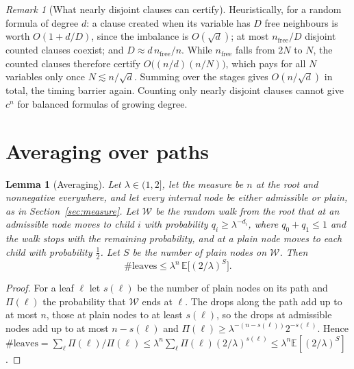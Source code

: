 \documentclass[11pt,a4paper]{article}
\newtheorem{lemma}[theorem]{Lemma}
\theoremstyle{remark}
\newtheorem{remark}[theorem]{Remark}
\newcommand{\E}{\mathbb{E}}
\newcommand{\W}{\mathcal{W}}
\newcommand{\nfree}{n_{\mathrm{free}}}
\begin{document}
\begin{remark}[What nearly disjoint clauses can certify]\label{rem:disjointcap}
Heuristically, for a random formula of degree $d$: a clause created when its
variable has $D$ free neighbours is worth $O(1+d/D)$, since the imbalance is
$O(\sqrt d)$; at most $\nfree/D$ disjoint counted clauses coexist; and
$D\approx d\,\nfree/n$. While $\nfree$ falls from $2N$ to $N$, the counted
clauses therefore certify $O\bigl((n/d)(n/N)\bigr)$, which pays for all $N$
variables only once $N\lesssim n/\sqrt d$. Summing over the stages gives
$O(n/\sqrt d)$ in total, the timing barrier again. Counting only nearly disjoint
clauses cannot give $c^n$ for balanced formulas of growing degree.
\end{remark}

\section{Averaging over paths}\label{sec:averaging}

\begin{lemma}[Averaging]\label{lem:avg}
Let $\lambda\in(1,2]$, let the measure be $n$ at the root and nonnegative
everywhere, and let every internal node be either admissible or plain, as in
Section~\ref{sec:measure}. Let $\W$ be the random walk from the root that at an
admissible node moves to child $i$ with probability $q_i\ge\lambda^{-d_i}$,
where $q_0+q_1\le1$ and the walk stops with the remaining probability, and at a
plain node moves to each child with probability $\frac12$. Let $S$ be the
number of plain nodes on $\W$. Then
\[
 \#\text{leaves}\le\lambda^n\,\E\bigl[(2/\lambda)^S\bigr].
\]
\end{lemma}

\begin{proof}
For a leaf $\ell$ let $s(\ell)$ be the number of plain nodes on its path and
$\Pi(\ell)$ the probability that $\W$ ends at $\ell$. The drops along the path
add up to at most $n$, those at plain nodes to at least $s(\ell)$, so the drops
at admissible nodes add up to at most $n-s(\ell)$ and
$\Pi(\ell)\ge\lambda^{-(n-s(\ell))}2^{-s(\ell)}$. Hence
$\#\text{leaves}=\sum_\ell\Pi(\ell)/\Pi(\ell)\le\lambda^n\sum_\ell\Pi(\ell)
(2/\lambda)^{s(\ell)}\le\lambda^n\E[(2/\lambda)^S]$.
\end{proof}
\end{document}
